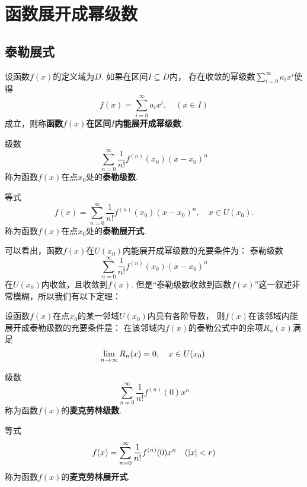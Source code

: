 \section{函数展开成幂级数}
\subsection{泰勒展式}
\begin{definition}
设函数\(f(x)\)的定义域为\(D\).
如果在区间\(I \subseteq D\)内，%
存在收敛的幂级数\(\sum\limits_{i=0}^{\infty}{a_i x^i}\)使得\[
f(x) = \sum\limits_{i=0}^{\infty}{a_i x^i}, \quad (x \in I)
\]成立，则称\textbf{函数\(f(x)\)在区间\(I\)内能展开成幂级数}.
\end{definition}

\begin{definition}
级数\[
\sum\limits_{n=0}^{\infty} \frac{1}{n!} f^{(n)}(x_0) (x-x_0)^n
\]称为函数\(f(x)\)在点\(x_0\)处的\textbf{泰勒级数}.

等式\[
f(x) = \sum\limits_{n=0}^{\infty}{\frac{1}{n!} f^{(n)}(x_0) (x-x_0)^n},
\quad x \in U(x_0).
\]称为函数\(f(x)\)在点\(x_0\)处的\textbf{泰勒展开式}.
\end{definition}

可以看出，函数\(f(x)\)在\(U(x_0)\)内能展开成幂级数的充要条件为：
泰勒级数\[
\sum\limits_{n=0}^{\infty}{\frac{1}{n!} f^{(n)}(x_0) (x-x_0)^n}
\]在\(U(x_0)\)内收敛，且收敛到\(f(x)\).
但是“泰勒级数收敛到函数\(f(x)\)”这一叙述非常模糊，所以我们有以下定理：
\begin{theorem}
设函数\(f(x)\)在点\(x_0\)的某一邻域\(U(x_0)\)内具有各阶导数，%
则\(f(x)\)在该邻域内能展开成泰勒级数的充要条件是：
在该邻域内\(f(x)\)的泰勒公式中的余项\(R_n(x)\)满足\[
\lim\limits_{n\to\infty} R_n(x) = 0,
\quad x \in U(x_0).
\]
\end{theorem}

\begin{definition}
级数\[
\sum\limits_{n=0}^{\infty} \frac{1}{n!} f^{(n)}(0) x^n
\]称为函数\(f(x)\)的\textbf{麦克劳林级数}.

等式\[
f(x) = \sum\limits_{n=0}^{\infty}{\frac{1}{n!} f^{(n)}(0) x^n}
\quad (\abs{x} < r)
\]称为函数\(f(x)\)的\textbf{麦克劳林展开式}.
\end{definition}

